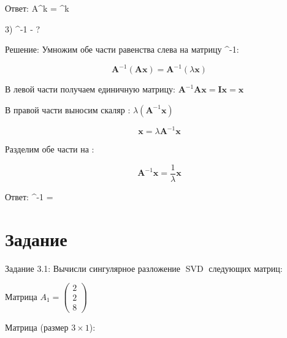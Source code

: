 \documentclass{article}
\begin{document}
Ответ: A^k = \lambda ^{k}


3)  ^{-1} - ?

Решение:
Умножим обе части равенства слева на матрицу ^{-1}:

\[\mathbf{A}^{-1}(\mathbf{Ax})=\mathbf{A}^{-1}(\lambda \mathbf{x})\]

В левой части получаем единичную матрицу: \(\mathbf{A}^{-1}\mathbf{A}\mathbf{x} = \mathbf{I}\mathbf{x} = \mathbf{x}\)

В правой части выносим скаляр \lambda {}: \(\lambda (\mathbf{A}^{-1}\mathbf{x})\)

\[\mathbf{x}=\lambda \mathbf{A}^{-1}\mathbf{x}\]

Разделим обе части на \lambda : 

\[\mathbf{A}^{-1}\mathbf{x}=\frac{1}{\lambda }\mathbf{x}\]

Ответ:
^{-1}  = 

\section{Задание}
Задание 3.1: Вычисли сингулярное разложение SVD следующих матриц:

Матрица \(A_1 = \begin{pmatrix} 2 \\ 2 \\ 8 \end{pmatrix}\)

Матрица \Sigma (размер \(3 \times 1\)):
\end{document}
